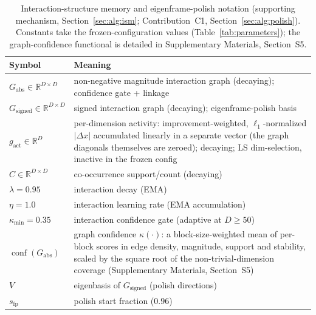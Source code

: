 %
\begin{table}[t]
\caption{Interaction-structure memory and eigenframe-polish notation
(supporting mechanism, Section~\ref{sec:alg:ism}; Contribution~C1,
Section~\ref{sec:alg:polish}). Constants take the frozen-configuration values
(Table~\ref{tab:parameters}); the graph-confidence functional is detailed in
Supplementary Materials, Section~S5.}
\label{tab:notation-ism}
\centering
\footnotesize
\begin{tabular}{@{}l@{\hspace{1.2em}}p{}@{}}
\toprule
\textbf{Symbol} & \textbf{Meaning}\\
\midrule
$G_{\mathrm{abs}}\in\mathbb{R}^{D\times D}$ & non-negative magnitude interaction graph (decaying); confidence gate + linkage\\
$G_{\mathrm{signed}}\in\mathbb{R}^{D\times D}$ & signed interaction graph (decaying); eigenframe-polish basis\\
$g_{\mathrm{act}}\in\mathbb{R}^{D}$ & per-dimension activity: improvement-weighted, $\ell_1$-normalized $\lvert\Delta x\rvert$ accumulated linearly in a separate vector (the graph diagonals themselves are zeroed); decaying; LS dim-selection, inactive in the frozen config\\
$C\in\mathbb{R}^{D\times D}$ & co-occurrence support/count (decaying)\\
$\lambda=0.95$ & interaction decay (EMA)\\
$\eta=1.0$ & interaction learning rate (EMA accumulation)\\
$\kappa_{\min}=0.35$ & interaction confidence gate (adaptive at $D\ge50$)\\
$\operatorname{conf}(G_{\mathrm{abs}})$ & graph confidence $\kappa(\cdot)$: a block-size-weighted mean of per-block scores in edge density, magnitude, support and stability, scaled by the square root of the non-trivial-dimension coverage (Supplementary Materials, Section~S5)\\
$V$ & eigenbasis of $G_{\mathrm{signed}}$ (polish directions)\\
$s_{\text{fp}}$ & polish start fraction ($0.96$)\\
\bottomrule
\end{tabular}
\end{table}
